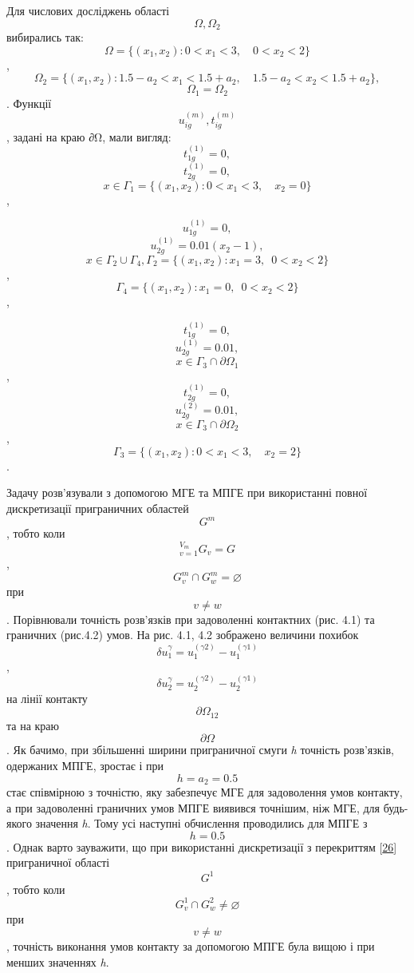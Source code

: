 Для числових досліджень області \[{\Omega,\Omega_{2}}{}\] вибирались
так:
\[{\Omega = {\{{(x_{1},x_{2}):{0 < x_{1} < 3},\quad{0 < x_{2} < 2}}\}}}{}\],
\[{{\Omega_{2} = {\{{(x_{1},x_{2}):1\text{.}{{5 - a_{2}} < x_{1} < 1}\text{.}{5 + a_{2}},\quad 1\text{.}{{5 - a_{2}} < x_{2} < 1}\text{.}{5 + a_{2}}}\}}},}{}\]
\[{{\Omega_{1} = \Omega}{}_{2}}{}\]. Функції
\[{u_{\mathit{\text{ig}}}^{(m)},t_{\mathit{\text{ig}}}^{(m)}}{}\],
задані на краю ∂Ω, мали вигляд: \[{{t_{1g}^{(1)} = 0},}{}\]
\[{{t_{2g}^{(1)} = 0},}{}\]
\[{x\in{\Gamma_{1} = {\{{(x_{1},x_{2}):{0 < x_{1} < 3},\quad{x_{2} = 0}}\}}}}{}\],

\[{{u_{1g}^{(1)} = 0},}{}\]
\[{{u_{2g}^{(1)} = 0}\text{.}\text{01}({x_{2} - 1}),}{}\]\[{x\in{\Gamma_{2} \cup \Gamma_{4}},{\Gamma_{2} = {\{{(x_{1},x_{2}):{x_{1} = 3},\mspace{9mu}{0 < x_{2} < 2}}\}}}}{}\],\[{\Gamma_{4} = {\{{(x_{1},x_{2}):{x_{1} = 0},\mspace{9mu}{0 < x_{2} < 2}}\}}}{}\],

\[{{t_{1g}^{(1)} = 0},}{}\] \[{{u_{2g}^{(1)} = 0}\text{.}\text{01},}{}\]
\[{x\in{\Gamma_{3} \cap \partial}\Omega_{1}}{}\],
\[{{t_{2g}^{(1)} = 0},}{}\] \[{{u_{2g}^{(2)} = 0}\text{.}\text{01},}{}\]
\[{x\in{\Gamma_{3} \cap \partial}\Omega_{2}}{}\],
\[{\Gamma_{3} = {\{{(x_{1},x_{2}):{0 < x_{1} < 3},\quad{x_{2} = 2}}\}}}{}\].

Задачу розв'язували з допомогою МГЕ та МПГЕ при використанні повної
дискретизації приграничних областей \[G^{m}{}\], тобто коли
\[{{}_{v = 1}^{V_{m}}G_{v}{= G}}{}\],
\[{{G_{v}^{m} \cap G_{w}^{m}} = \varnothing}{}\] при \[{v \neq w}{}\].
Порівню­вали точність розв'язків при задоволенні контактних (рис. 4.1)
та граничних (рис.4.2) умов. На рис. 4.1, 4.2 зображено величини похибок
\[{\mathit{\delta u}_{1}^{\gamma} = {u_{1}^{(\gamma 2)} - u_{1}^{(\gamma 1)}}}{}\],
\[{\mathit{\delta u}_{2}^{\gamma} = {u_{2}^{(\gamma 2)} - u_{2}^{(\gamma 1)}}}{}\]
на лінії контакту \[{\partial\Omega_{\text{12}}}{}\] та на краю
\[{\partial\Omega}{}\]. Як бачимо, при збільшенні ширини приграничної
смуги \emph{h }точність розв'язків, одержаних МПГЕ, зростає і при
\[{{h = a_{2} = 0}\text{.}5}{}\] стає співмірною з точністю, яку
забезпечує МГЕ для задоволення умов контакту, а при задоволенні
граничних умов МПГЕ виявився точнішим, ніж МГЕ, для будь-якого значення
\emph{h}. Тому усі наступні обчислення проводились для МПГЕ з
\[{{h = 0}\text{.}5}{}\]. Однак варто зауважити, що при використанні
дискретизації з перекриттям {[}\protect\hyperlink{anchor-58}{26}{]}
приграничної області \[G^{1}{}\], тобто коли
\[{{G_{v}^{1} \cap G_{w}^{2}} \neq \varnothing}{}\] при
\[{v \neq w}{}\], точність виконання умов контакту за допомогою МПГЕ
була вищою і при менших значеннях \emph{h}.


